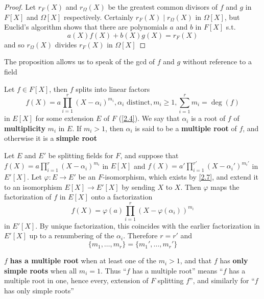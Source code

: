 \documentclass[11pt]{article}
\begin{document}
\begin{proof}
Let \(r_F(X)\) and \(r_\Omega(X)\) be the greatest common divisors of \(f\) and \(g\) in \(F[X]\)
and \(\Omega[X]\) respectively. Certainly \(r_F(X)\mid r_\Omega(X)\) in \(\Omega[X]\), but Euclid's algorithm
shows that there are polynomials \(a\) and \(b\) in \(F[X]\) s.t.
\begin{equation*}
a(X)f(X)+b(X)g(X)=r_F(X)
\end{equation*}
and so \(r_\Omega(X)\) divides \(r_F(X)\) in \(\Omega[X]\)
\end{proof}

The proposition allows us to speak of the gcd of \(f\) and \(g\) without reference to a field

Let \(f\in F[X]\), then \(f\) splits into linear factors
\begin{equation*}
f(X)=a\prod_{i=1}^r(X-\alpha_i)^{m_i},\alpha_i\text{ distinct}, m_i\ge 1,\sum_{i=1}^rm_i=\deg(f)
\end{equation*}
in \(E[X]\) for some extension \(E\) of \(F\) (\ref{2.4}). We say that \(\alpha_i\) is a root of \(f\)
of \textbf{multiplicity} \(m_i\) in \(E\). If \(m_i>1\), then \(\alpha_i\) is said to be a \textbf{multiple root}
of \(f\), and otherwise it is a \textbf{simple root}

Let \(E\) and \(E'\) be splitting fields for \(F\), and suppose
that \(f(X)=a\prod_{i=1}^r(X-\alpha_i)^{m_i}\) in \(E[X]\) and \(f(X)=a'\prod_{i=1}^{r'}(X-\alpha_i')^{m_i'}\)
in \(E'[X]\). Let \(\varphi:E\to E'\) be an \(F\)-isomorphism, which exists by \ref{2.7}, and extend it to
an isomorphism \(E[X]\to E'[X]\) by sending \(X\) to \(X\). Then \(\varphi\) maps the factorization of \(f\)
in \(E[X]\) onto a factorization
\begin{equation*}
f(X)=\varphi(a)\prod_{i=1}^r(X-\varphi(\alpha_i))^{m_i}
\end{equation*}
in \(E'[X]\). By unique factorization, this coincides with the earlier factorization
in \(E'[X]\) up to a renumbering of the \(\alpha_i\). Therefore \(r=r'\) and
\begin{equation*}
\{m_1,\dots,m_r\}=\{m_1',\dots,m_r'\}
\end{equation*}

\(f\) \textbf{has a multiple root} when at least one of the \(m_i>1\), and that \(f\) has \textbf{only simple
roots} when all \(m_i=1\). Thus ``\(f\) has a multiple root'' means ``\(f\) has a multiple root in
one, hence every, extension of \(F\) splitting \(f\)'', and similarly for ``\(f\) has only simple roots''
\end{document}
